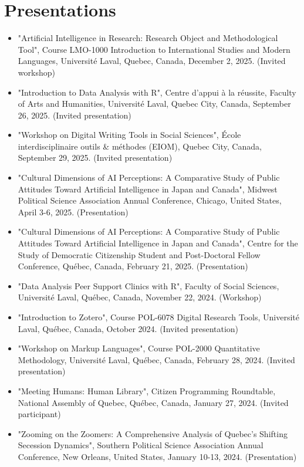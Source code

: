 \documentclass[11pt,letterpaper,sans]{moderncv}        %
\begin{document}
\section{Presentations}
\begin{itemize}
    \item "Artificial Intelligence in Research: Research Object and Methodological Tool", Course LMO-1000 Introduction to International Studies and Modern Languages, Université Laval, Quebec, Canada, December 2, 2025. (Invited workshop)
    \item "Introduction to Data Analysis with R", Centre d'appui à la réussite, Faculty of Arts and Humanities, Université Laval, Quebec City, Canada, September 26, 2025. (Invited presentation)
    \item "Workshop on Digital Writing Tools in Social Sciences", École interdisciplinaire outils \& méthodes (EIOM), Quebec City, Canada, September 29, 2025. (Invited presentation)
    \item "Cultural Dimensions of AI Perceptions: A Comparative Study of Public Attitudes Toward Artificial Intelligence in Japan and Canada", Midwest Political Science Association Annual Conference, Chicago, United States, April 3-6, 2025. (Presentation)
  \item "Cultural Dimensions of AI Perceptions: A Comparative Study of Public Attitudes Toward Artificial Intelligence in Japan and Canada", Centre for the Study of Democratic Citizenship Student and Post-Doctoral Fellow Conference, Québec, Canada, February 21, 2025. (Presentation)
  \item "Data Analysis Peer Support Clinics with R", Faculty of Social Sciences, Université Laval, Québec, Canada, November 22, 2024. (Workshop)
  \item "Introduction to Zotero", Course POL-6078 Digital Research Tools, Université Laval, Québec, Canada, October 2024. (Invited presentation)
  \item "Workshop on Markup Languages", Course POL-2000 Quantitative Methodology, Université Laval, Québec, Canada, February 28, 2024. (Invited presentation)
  \item "Meeting Humans: Human Library", Citizen Programming Roundtable, National Assembly of Quebec, Québec, Canada, January 27, 2024. (Invited participant)
  \item "Zooming on the Zoomers: A Comprehensive Analysis of Quebec's Shifting Secession Dynamics", Southern Political Science Association Annual Conference, New Orleans, United States, January 10-13, 2024. (Presentation)
\end{itemize}
\end{document}
